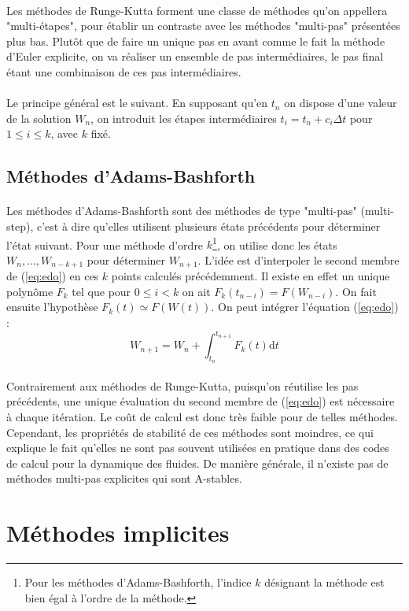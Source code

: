     \paragraph{}
    Les méthodes de Runge-Kutta forment une classe de méthodes qu'on appellera "multi-étapes", pour établir un contraste avec les méthodes "multi-pas" présentées plus bas.
    Plutôt que de faire un unique pas en avant comme le fait la méthode d'Euler explicite, on va réaliser un ensemble de pas intermédiaires, le pas final étant une combinaison de ces pas intermédiaires.

    \paragraph{}
    Le principe général est le suivant.
    En supposant qu'en $t_n$ on dispose d'une valeur de la solution $W_n$, on introduit les étapes intermédiaires $t_i = t_n + c_i\Delta t$ pour $1\leq i\leq k$, avec $k$ fixé.

  \subsection{Méthodes d'Adams-Bashforth}

    \paragraph{}
    Les méthodes d'Adams-Bashforth sont des méthodes de type "multi-pas" (multi-step), c'est à dire qu'elles utilisent plusieurs états précédents pour déterminer l'état suivant.
    Pour une méthode d'ordre $k$\footnote{Pour les méthodes d'Adams-Bashforth, l'indice $k$ désignant la méthode est bien égal à l'ordre de la méthode.}, on utilise donc les états $W_n, \dots, W_{n-k+1}$ pour déterminer $W_{n+1}$.
    L'idée est d'interpoler le second membre de (\ref{eq:edo}) en ces $k$ points calculés précédemment.
    Il existe en effet un unique polynôme $F_k$ tel que pour $0 \leq i < k$ on ait $F_k\left(t_{n-i}\right) = F\left(W_{n-i}\right)$.
    On fait ensuite l'hypothèse $F_k\left(t\right) \simeq F\left(W\left(t\right)\right)$.
    On peut intégrer l'équation (\ref{eq:edo}) :
    $$W_{n+1} = W_n + \int_{t_n}^{t_{n+1}}F_k\left(t\right)\mathrm{d}t$$

    \paragraph{}
    Contrairement aux méthodes de Runge-Kutta, puisqu'on réutilise les pas précédents, une unique évaluation du second membre de (\ref{eq:edo}) est nécessaire à chaque itération.
    Le coût de calcul est donc très faible pour de telles méthodes.
    Cependant, les propriétés de stabilité de ces méthodes sont moindres, ce qui explique le fait qu'elles ne sont pas souvent utilisées en pratique dans des codes de calcul pour la dynamique des fluides.
    De manière générale, il n'existe pas de méthodes multi-pas explicites qui sont A-stables.





\section{Méthodes implicites}
